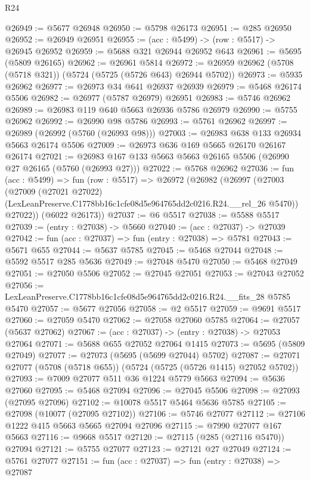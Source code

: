 \begin{lexlean}{R24}
\begin{coremodule}
@26949 := @5677 @26948
@26950 := @5798 @26173
@26951 := @285 @26950
@26952 := @26949 @26951
@26955 := (acc : @5499) -> (row : @5517) -> @26945 @26952
@26959 := @5688 @321 @26944 @26952 @643
@26961 := @5695 (@5809 @26165)
@26962 := @26961 @5814
@26972 := @26959 @26962 (@5708 (@5718 @321)) (@5724 (@5725 (@5726 @643) @26944 @5702))
@26973 := @5935 @26962
@26977 := @26973 @34 @641 @26937 @26939
@26979 := @5468 @26174 @5506
@26982 := @26977 (@5787 @26979) @26951
@26983 := @5746 @26962
@26989 := @26983 @119 @640 @5663 @26936 @5786 @26979
@26990 := @5755 @26962
@26992 := @26990 @98 @5786
@26993 := @5761 @26962
@26997 := @26989 (@26992 (@5760 (@26993 @98)))
@27003 := @26983 @638 @133 @26934 @5663 @26174 @5506
@27009 := @26973 @636 @169 @5665 @26170 @26167 @26174
@27021 := @26983 @167 @133 @5663 @5663 @26165 @5506 (@26990 @27 @26165 (@5760 (@26993 @27)))
@27022 := @5768 @26962
@27036 := fun (acc : @5499) =>
  fun (row : @5517) =>
  @26972
    (@26982
      (@26997
        (@27003
          (@27009
            (@27021 @27022)
            (LexLeanPreserve.C1778bb16c1cfe08d5e964765dd2c0216.R24.__rel_26 @5470))
          @27022))
      (@6022 @26173))
@27037 := @6 @5517
@27038 := @5588 @5517
@27039 := (entry : @27038) -> @5660
@27040 := (acc : @27037) -> @27039
@27042 := fun (acc : @27037) => fun (entry : @27038) => @5781
@27043 := @5671 @655
@27044 := @5637 @5785
@27045 := @5468 @27044
@27048 := @5592 @5517 @285 @5636
@27049 := @27048 @5470
@27050 := @5468 @27049
@27051 := @27050 @5506
@27052 := @27045 @27051
@27053 := @27043 @27052
@27056 := LexLeanPreserve.C1778bb16c1cfe08d5e964765dd2c0216.R24.__fits_28 @5785 @5470
@27057 := @5677 @27056
@27058 := @2 @5517
@27059 := @9691 @5517
@27060 := @27059 @5470
@27062 := @27058 @27060 @5785
@27064 := @27057 (@5637 @27062)
@27067 := (acc : @27037) -> (entry : @27038) -> @27053 @27064
@27071 := @5688 @655 @27052 @27064 @1415
@27073 := @5695 (@5809 @27049)
@27077 := @27073 (@5695 (@5699 @27044) @5702)
@27087 := @27071 @27077 (@5708 (@5718 @655)) (@5724 (@5725 (@5726 @1415) @27052 @5702))
@27093 := @7009 @27077 @511 @36 @1224 @5779 @5663
@27094 := @5636 @27060
@27095 := @5468 @27094
@27096 := @27045 @5506
@27098 := @27093 (@27095 @27096)
@27102 := @10078 @5517 @5464 @5636 @5785
@27105 := @27098 (@10077 (@27095 @27102))
@27106 := @5746 @27077
@27112 := @27106 @1222 @415 @5663 @5665 @27094 @27096
@27115 := @7990 @27077 @167 @5663
@27116 := @9668 @5517
@27120 := @27115 (@285 (@27116 @5470)) @27094
@27121 := @5755 @27077
@27123 := @27121 @27 @27049
@27124 := @5761 @27077
@27151 := fun (acc : @27037) =>
  fun (entry : @27038) =>
  @27087

\end{coremodule}
\end{lexlean}
